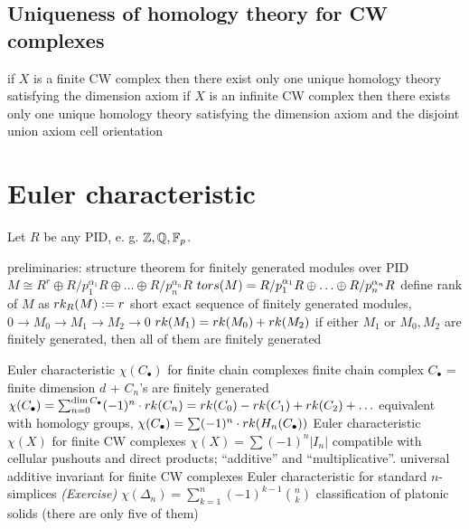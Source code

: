 \subsection{Uniqueness of homology theory for CW complexes}


\begin{outline}
    \1 if $X$ is a finite CW complex then there exist only one unique homology theory satisfying the dimension axiom 
    \1 if $X$ is an infinite CW complex then there exists only one unique homology theory satisfying the dimension axiom and the disjoint union axiom
    \1 cell orientation 
\end{outline}

\section{Euler characteristic}


\begin{outline}
\0 Let $R$ be any PID, e. g. $\mathbb{Z}, \mathbb{Q}, \mathbb{F}_p$. 

\1 preliminaries:   
    \2 structure theorem for finitely generated modules over PID 
        \3 $M \cong R^r \oplus R/p_1^{\alpha_1}R \oplus \ldots \oplus R/p_n^{\alpha_n}R$
        \3 $tors(M)= R/p_1^{\alpha_1}R \oplus \ldots \oplus R/p_n^{\alpha_n}R$
        \3 define rank of $M$ as $rk_R (M) := r$
    \2 short exact sequence of finitely generated modules,      
        \3 $0 \rightarrow M_0   \rightarrow M_1 \rightarrow     M_2 \rightarrow 0$
        \3 $rk (M_1)=rk (M_0) + rk (M_2)$
        \3 if either $M_1$ or $M_0,M_2$ are finitely generated, then all of them are finitely generated

\1 Euler characteristic $\chi(C_\bullet)$ for finite chain complexes
    \2 finite chain complex $C_\bullet$ = finite dimension $d$ + $C_n$'s are finitely generated
    \2 $\chi(C_\bullet) = \sum_{n = 0}^{\dim C_\bullet} (-1)^n \cdot rk(C_n)= rk(C_0) - rk(C_1) + rk(C_2) + \ldots$
    \2 equivalent with homology groups, $\chi(C_\bullet)=\sum (-1)^n \cdot rk(H_n(C_\bullet))$
\1 Euler characteristic $\chi(X)$ for finite CW complexes
    \2 $\chi(X)=\sum (-1)^n |I_n|$
    \2 compatible with cellular pushouts and direct products; \enquote{additive} and \enquote{multiplicative}.
\1 universal additive invariant for finite CW complexes
\1 Euler characteristic for standard $n$-simplices \textit{(Exercise)}
    \2 $\chi(\Delta_n)=\sum_{k=1}^{n}(-1)^{k-1}\binom{n}{k}$
\1 classification of platonic solids (there are only five of them)
\end{outline}

